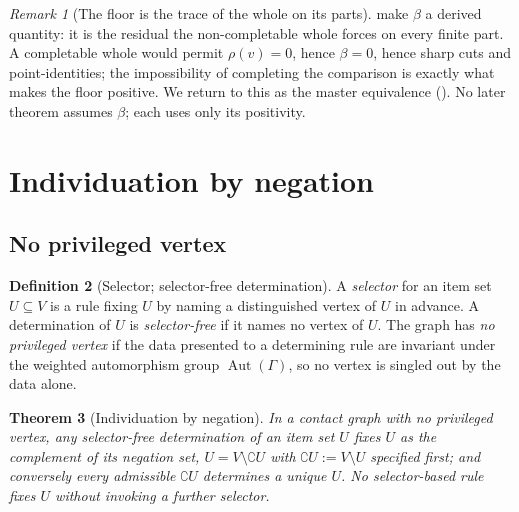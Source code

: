 \documentclass[11pt,a4paper]{article}
\theoremstyle{thmstyle}
\newtheorem{theorem}{Theorem}[section]
\theoremstyle{definition}
\newtheorem{definition}[theorem]{Definition}
\theoremstyle{remark}
\newtheorem{remark}[theorem]{Remark}
\newcommand{\Gph}{\Gamma}
\newcommand{\V}{V}
\newcommand{\flo}{\beta}                 %
\newcommand{\co}{\complement}
\newcommand{\res}{\rho}                  %
\begin{document}
\begin{remark}[The floor is the trace of the whole on its parts]
\label{rem:trace}
 make $\flo$ a derived quantity: it is
the residual the non-completable whole forces on every finite part.
A completable whole would permit $\res(v)=0$, hence $\flo=0$, hence sharp
cuts and point-identities; the impossibility of completing the comparison
is exactly what makes the floor positive. We return to this as the master
equivalence (). No later theorem assumes $\flo$; each
uses only its positivity.
\end{remark}

\section{Individuation by negation}
\label{sec:negation}

\subsection{No privileged vertex}

\begin{definition}[Selector; selector-free determination]
\label{def:selector}
A \emph{selector} for an item set $U\subseteq\V$ is a rule fixing $U$ by
naming a distinguished vertex of $U$ in advance. A determination of $U$ is
\emph{selector-free} if it names no vertex of $U$. The graph has \emph{no
privileged vertex} if the data presented to a determining rule are
invariant under the weighted automorphism group $\operatorname{Aut}(\Gph)$,
so no vertex is singled out by the data alone.
\end{definition}

\begin{theorem}[Individuation by negation]
\label{thm:negation}
In a contact graph with no privileged vertex, any selector-free
determination of an item set $U$ fixes $U$ as the complement of its
negation set, $U=\V\setminus\co U$ with $\co U:=\V\setminus U$ specified
first; and conversely every admissible $\co U$ determines a unique $U$. No
selector-based rule fixes $U$ without invoking a further selector.
\end{theorem}
\end{document}
